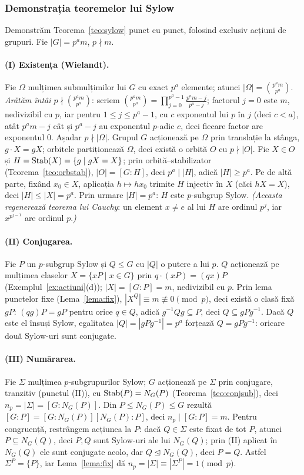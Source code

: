\subsubsection*{Demonstrația teoremelor lui Sylow}\label{dem:sylow}

Demonstrăm Teorema~\ref{teo:sylow} punct cu punct, folosind exclusiv acțiuni de grupuri. Fie $|G|=p^am$, $p\nmid m$.

\paragraph{(I) Existența (Wielandt).}
Fie $\Omega$ mulțimea submulțimilor lui $G$ cu exact $p^a$ elemente; atunci $|\Omega|=\binom{p^am}{p^a}$. \emph{Arătăm întâi $p\nmid\binom{p^am}{p^a}$}: scriem $\binom{p^am}{p^a}=\prod_{j=0}^{p^a-1}\frac{p^am-j}{p^a-j}$; factorul $j=0$ este $m$, nedivizibil cu $p$, iar pentru $1\le j\le p^a-1$, cu $c$ exponentul lui $p$ în $j$ (deci $c<a$), atât $p^am-j$ cât și $p^a-j$ au exponentul $p$-adic $c$, deci fiecare factor are exponentul $0$. Așadar $p\nmid|\Omega|$. Grupul $G$ acționează pe $\Omega$ prin translație la stânga, $g\cdot X=gX$; orbitele partiționează $\Omega$, deci există o orbită $O$ cu $p\nmid|O|$. Fie $X\in O$ și $H=\operatorname{Stab}(X)=\{g\mid gX=X\}$; prin orbită--stabilizator (Teorema~\ref{teo:orbstab}), $|O|=[G:H]$, deci $p^a\mid|H|$, adică $|H|\ge p^a$. Pe de altă parte, fixând $x_0\in X$, aplicația $h\mapsto hx_0$ trimite $H$ injectiv în $X$ (căci $hX=X$), deci $|H|\le|X|=p^a$. Prin urmare $|H|=p^a$: $H$ este $p$-subgrup Sylow. \emph{(Aceasta regenerează teorema lui Cauchy}: un element $x\neq e$ al lui $H$ are ordinul $p^j$, iar $x^{p^{j-1}}$ are ordinul $p$.\emph{)}

\paragraph{(II) Conjugarea.}
Fie $P$ un $p$-subgrup Sylow și $Q\le G$ cu $|Q|$ o putere a lui $p$. $Q$ acționează pe mulțimea claselor $X=\{xP\mid x\in G\}$ prin $q\cdot(xP)=(qx)P$ (Exemplul~\ref{ex:actiuni}(d)); $|X|=[G:P]=m$, nedivizibil cu $p$. Prin lema punctelor fixe (Lema~\ref{lema:fix}), $|X^Q|\equiv m\not\equiv0\pmod p$, deci există o clasă fixă $gP$: $(qg)P=gP$ pentru orice $q\in Q$, adică $g^{-1}Qg\subseteq P$, deci $Q\subseteq gPg^{-1}$. Dacă $Q$ este el însuși Sylow, egalitatea $|Q|=|gPg^{-1}|=p^a$ forțează $Q=gPg^{-1}$: oricare două Sylow-uri sunt conjugate.

\paragraph{(III) Numărarea.}
Fie $\Sigma$ mulțimea $p$-subgrupurilor Sylow; $G$ acționează pe $\Sigma$ prin conjugare, tranzitiv (punctul (II)), cu $\operatorname{Stab}(P)=N_G(P)$ (Teorema~\ref{teo:conjsub}), deci $n_p=|\Sigma|=[G:N_G(P)]$. Din $P\le N_G(P)\le G$ rezultă $[G:P]=[G:N_G(P)][N_G(P):P]$, deci $n_p\mid[G:P]=m$. Pentru congruență, restrângem acțiunea la $P$: dacă $Q\in\Sigma$ este fixat de tot $P$, atunci $P\subseteq N_G(Q)$, deci $P,Q$ sunt Sylow-uri ale lui $N_G(Q)$; prin (II) aplicat în $N_G(Q)$ ele sunt conjugate acolo, dar $Q\trianglelefteq N_G(Q)$, deci $P=Q$. Astfel $\Sigma^P=\{P\}$, iar Lema~\ref{lema:fix} dă $n_p=|\Sigma|\equiv|\Sigma^P|=1\pmod p$.

